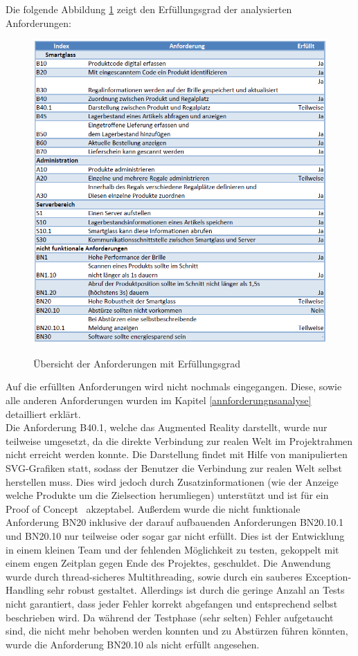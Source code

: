 Die folgende Abbildung \ref{fig:anforderungen_erfuellt} zeigt den Erfüllungsgrad der analysierten Anforderungen:
\begin{figure}[H]
	\centering
	{\includegraphics[width=\textwidth]{Bilder/Abbildungen/anforderungen_zusammenfassung_bewertung.png}}
	\caption{Übersicht der Anforderungen mit Erfüllungsgrad}
	\label{fig:anforderungen_erfuellt}
\end{figure}
Auf die erfüllten Anforderungen wird nicht nochmals eingegangen. Diese, sowie alle anderen Anforderungen wurden im Kapitel \ref{annforderungnsanalyse}  detailliert erklärt.\\
Die Anforderung B40.1, welche das Augmented Reality darstellt, wurde nur teilweise umgesetzt, da die direkte Verbindung zur realen Welt im Projektrahmen nicht erreicht werden konnte. Die Darstellung findet mit Hilfe von manipulierten SVG-Grafiken statt, sodass der Benutzer die Verbindung zur realen Welt selbst herstellen muss. Dies wird jedoch durch Zusatzinformationen (wie \zB der Anzeige welche Produkte um die Zielsection herumliegen) unterstützt und ist für ein \glqq Proof of Concept\grqq~ akzeptabel.
Außerdem wurde die nicht funktionale Anforderung BN20 inklusive der darauf aufbauenden Anforderungen BN20.10.1 und BN20.10 nur teilweise oder sogar gar nicht erfüllt. Dies ist der Entwicklung in einem kleinen Team und der fehlenden Möglichkeit zu testen, gekoppelt mit einem engen Zeitplan gegen Ende des Projektes, geschuldet. Die Anwendung wurde durch thread-sicheres Multithreading, sowie durch ein sauberes Exception-Handling sehr robust gestaltet. Allerdings ist durch die geringe Anzahl an Tests nicht garantiert, dass jeder Fehler korrekt abgefangen und entsprechend selbst beschrieben wird. Da während der Testphase (sehr selten) Fehler aufgetaucht sind, die nicht mehr behoben werden konnten und zu Abstürzen führen könnten, wurde die Anforderung BN20.10 als nicht erfüllt angesehen.\\

